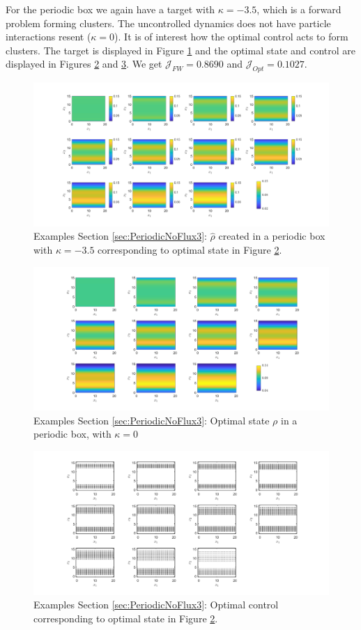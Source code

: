 \documentclass[11pt, a4paper]{article}
\theoremstyle{definition}
\newcommand{\hr}{\widehat \rho}
\begin{document}
For the periodic box we again have a target with $\kappa = -3.5$, which is a forward problem forming clusters. The uncontrolled dynamics does not have particle interactions resent ($\kappa =0$). It is of interest how the optimal control acts to form clusters. The target is displayed in Figure \ref{F8} and the optimal state and control are displayed in Figures \ref{F8a} and \ref{F8b}. We get $\mathcal J_{FW} = 0.8690$ and $\mathcal J_{Opt} = 0.1027$.
\begin{figure}[h]
	\centering
	\includegraphics[scale=0.35]{rhoHatPeri8.png}
	\caption{Examples Section \ref{sec:PeriodicNoFlux3}: $\hr$ created in a periodic box with $\kappa = -3.5$ corresponding to optimal state in Figure \ref{F8a}.} 
	\label{F8}
\end{figure}
\begin{figure}[h]
	\centering
	\includegraphics[scale=0.35]{rhoOptPeri8.png}
	\caption{Examples Section \ref{sec:PeriodicNoFlux3}: Optimal state $\rho$ in a periodic box, with $\kappa = 0$} 
	\label{F8a}
\end{figure}

\begin{figure}[h]
	\centering
	\includegraphics[scale=0.35]{ConOptPeri8.png}
	\caption{Examples Section \ref{sec:PeriodicNoFlux3}: Optimal control corresponding to optimal state in Figure \ref{F8a}.} 
	\label{F8b}
\end{figure}
\end{document}
